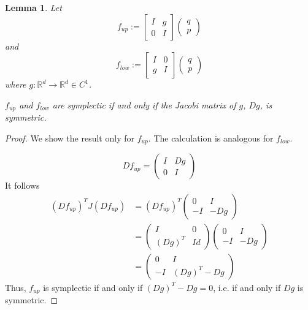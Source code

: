 \documentclass[twoside,a4paper]{article}
\newtheorem{lemma}{Lemma}
\begin{document}
\begin{lemma}\label{jacobi_symmetric}
	Let
	\begin{equation*}
		f_{up} := \begin{bmatrix}
			I & g \\
			0 & I
		\end{bmatrix} \begin{pmatrix}
			q \\
			p
		\end{pmatrix}
	\end{equation*}
	and
	\begin{equation*}
		f_{low} := \begin{bmatrix}
			I & 0 \\
			g & I
		\end{bmatrix} \begin{pmatrix}
			q \\
			p
		\end{pmatrix}
	\end{equation*}
	where $g: \mathbb{R}^d \rightarrow \mathbb{R}^d \in C^1$. 

	$f_{up}$ and $f_{low}$ are symplectic if and only if the Jacobi matrix of $g$, $Dg$,
	is symmetric.
\end{lemma}
\begin{proof}
	We show the result only for $f_{up}$. The calculation is analogous for $f_{low}$.

	\begin{equation*}
		Df_{up} = \begin{pmatrix}
			I & Dg \\
			0 & I
		\end{pmatrix}
	\end{equation*}
	It follows
	\begin{align*}
		\left(Df_{up}\right)^TJ(Df_{up}) &= \left(Df_{up}\right)^T \begin{pmatrix}
			0 & I \\
			-I & -Dg
		\end{pmatrix} \\
		&= \begin{pmatrix}
			I & 0 \\
			(Dg)^T & Id
		\end{pmatrix} \begin{pmatrix}
			0 & I \\
			-I & -Dg
		\end{pmatrix} \\
		&= \begin{pmatrix}
			0 & I \\
			-I & (Dg)^T-Dg
		\end{pmatrix}
	\end{align*}
	Thus, $f_{up}$ is symplectic if and only if $(Dg)^T-Dg=0$, i.e. if and only if $Dg$
	is symmetric.
\end{proof}
\end{document}
